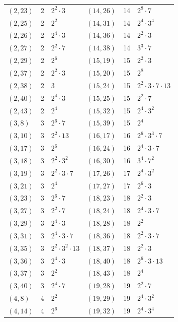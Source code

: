 \documentclass[11pt]{article}
\begin{document}
\begin{longtable}{@{}lrl@{\qquad}lrl@{}}
$(2,23)$ & 2 & $2^{2}\cdot 3$ & $(14,26)$ & 14 & $2^{8}\cdot 7$\\
$(2,25)$ & 2 & $2^{2}$ & $(14,31)$ & 14 & $2^{4}\cdot 3^{4}$\\
$(2,26)$ & 2 & $2^{4}\cdot 3$ & $(14,36)$ & 14 & $2^{2}\cdot 3$\\
$(2,27)$ & 2 & $2^{2}\cdot 7$ & $(14,38)$ & 14 & $3^{3}\cdot 7$\\
$(2,29)$ & 2 & $2^{6}$ & $(15,19)$ & 15 & $2^{2}\cdot 3$\\
$(2,37)$ & 2 & $2^{2}\cdot 3$ & $(15,20)$ & 15 & $2^{8}$\\
$(2,38)$ & 2 & $3$ & $(15,24)$ & 15 & $2^{2}\cdot 3\cdot 7\cdot 13$\\
$(2,40)$ & 2 & $2^{4}\cdot 3$ & $(15,25)$ & 15 & $2^{2}\cdot 7$\\
$(2,43)$ & 2 & $2^{4}$ & $(15,32)$ & 15 & $2^{4}\cdot 3^{2}$\\
$(3,8)$ & 3 & $2^{6}\cdot 7$ & $(15,39)$ & 15 & $2^{4}$\\
$(3,10)$ & 3 & $2^{2}\cdot 13$ & $(16,17)$ & 16 & $2^{6}\cdot 3^{3}\cdot 7$\\
$(3,17)$ & 3 & $2^{6}$ & $(16,24)$ & 16 & $2^{4}\cdot 3\cdot 7$\\
$(3,18)$ & 3 & $2^{2}\cdot 3^{2}$ & $(16,30)$ & 16 & $3^{4}\cdot 7^{2}$\\
$(3,19)$ & 3 & $2^{2}\cdot 3\cdot 7$ & $(17,26)$ & 17 & $2^{4}\cdot 3^{2}$\\
$(3,21)$ & 3 & $2^{4}$ & $(17,27)$ & 17 & $2^{6}\cdot 3$\\
$(3,23)$ & 3 & $2^{6}\cdot 7$ & $(18,23)$ & 18 & $2^{2}\cdot 3$\\
$(3,27)$ & 3 & $2^{2}\cdot 7$ & $(18,24)$ & 18 & $2^{4}\cdot 3\cdot 7$\\
$(3,29)$ & 3 & $2^{4}\cdot 3$ & $(18,28)$ & 18 & $2^{2}$\\
$(3,31)$ & 3 & $2^{4}\cdot 3\cdot 7$ & $(18,36)$ & 18 & $2^{2}\cdot 3\cdot 7$\\
$(3,35)$ & 3 & $2^{2}\cdot 3^{2}\cdot 13$ & $(18,37)$ & 18 & $2^{2}\cdot 3$\\
$(3,36)$ & 3 & $2^{4}\cdot 3$ & $(18,40)$ & 18 & $2^{6}\cdot 3\cdot 13$\\
$(3,37)$ & 3 & $2^{2}$ & $(18,43)$ & 18 & $2^{4}$\\
$(3,40)$ & 3 & $2^{4}\cdot 7$ & $(19,28)$ & 19 & $2^{2}\cdot 7$\\
$(4,8)$ & 4 & $2^{2}$ & $(19,29)$ & 19 & $2^{4}\cdot 3^{2}$\\
$(4,14)$ & 4 & $2^{6}$ & $(19,32)$ & 19 & $2^{4}\cdot 3^{4}$\\

\end{longtable}
\end{document}
